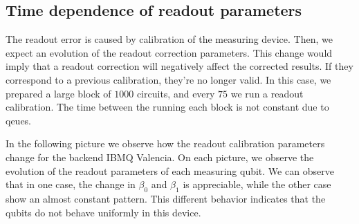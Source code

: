 \subsection{Time dependence of readout parameters}

The readout error is caused by calibration of the measuring device. Then, we expect an evolution of the readout correction parameters. This change would imply that a readout correction will negatively affect the corrected results. If they correspond to a previous calibration, they're no longer valid. In this case, we prepared a large block of $1000$ circuits, and every $75$ we run a readout calibration. The time between the running each block is not constant due to qeues.

In the following picture we observe how the readout calibration parameters change for the backend IBMQ Valencia. On each picture, we observe the evolution of the readout parameters of each measuring qubit. We can observe that in one case, the change in $\beta_0$ and $\beta_1$ is appreciable, while the other case show an almost constant pattern. This different behavior indicates that the qubits do not behave uniformly in this device.



